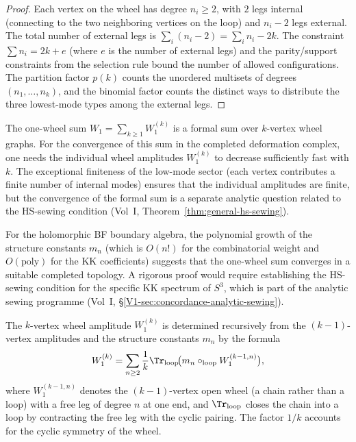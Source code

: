 \begin{proof}
Each vertex on the wheel has degree $n_i \geq 2$, with $2$ legs internal (connecting
to the two neighboring vertices on the loop) and $n_i - 2$ legs external. The total
number of external legs is $\sum_i (n_i - 2) = \sum_i n_i - 2k$. The constraint
$\sum n_i = 2k + e$ (where $e$ is the number of external legs) and the parity/support
constraints from the selection rule bound the number of allowed configurations. The
partition factor $p(k)$ counts the unordered multisets of degrees $(n_1, \ldots, n_k)$,
and the binomial factor counts the distinct ways to distribute the three lowest-mode
types among the external legs.
\end{proof}

\begin{remark}
The one-wheel sum $W_1 = \sum_{k \geq 1} W_1^{(k)}$ is a formal sum over
$k$-vertex wheel graphs. For the convergence of this sum in the completed
deformation complex, one needs the individual wheel amplitudes $W_1^{(k)}$ to
decrease sufficiently fast with $k$. The exceptional finiteness of the low-mode
sector (each vertex contributes a finite number of internal modes) ensures that
the individual amplitudes are finite, but the convergence of the formal sum is a
separate analytic question related to the HS-sewing condition
(Vol~I, Theorem~\ref*{thm:general-hs-sewing}).

For the holomorphic BF boundary algebra, the polynomial growth of the
structure constants $m_n$ (which is $O(n!)$ for the combinatorial weight and
$O(\mathrm{poly})$ for the KK coefficients) suggests that the one-wheel sum
converges in a suitable completed topology. A rigorous proof would require
establishing the HS-sewing condition for the specific KK spectrum of $S^3$, which
is part of the analytic sewing programme
(Vol~I, \S\ref*{V1-sec:concordance-analytic-sewing}).
\end{remark}

\begin{proposition}
\label{prop:recursive-wheel-determination}
The $k$-vertex wheel amplitude $W_1^{(k)}$ is determined recursively from the
$(k-1)$-vertex amplitudes and the structure constants $m_n$ by the formula
\begin{equation}
W_1^{(k)}
= \sum_{n \geq 2}
\frac{1}{k} \Tr_{\mathrm{loop}}\!\bigl(
m_n \circ_{\mathrm{loop}} W_1^{(k-1,n)}
\bigr),
\end{equation}
where $W_1^{(k-1,n)}$ denotes the $(k-1)$-vertex open wheel (a chain rather than a
loop) with a free leg of degree $n$ at one end, and $\Tr_{\mathrm{loop}}$ closes the
chain into a loop by contracting the free leg with the cyclic pairing. The factor
$1/k$ accounts for the cyclic symmetry of the wheel.
\end{proposition}

